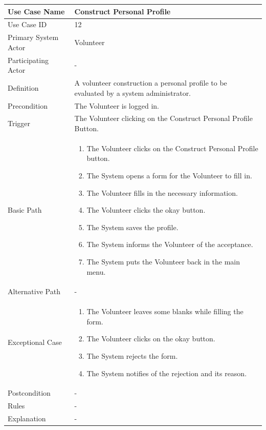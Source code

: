 \documentclass[a4paper,12pt]{report}
\begin{document}
		\begin{tabular}{|m{4cm}|m{11.5cm}|}
			\hline
				Use Case Name & Construct Personal Profile\\
			\hline
				Use Case ID & 12\\
			\hline
				Primary System Actor & Volunteer\\
			\hline
				Participating Actor & -\\
			\hline
				Definition & A volunteer construction a personal profile to be evaluated by a system administrator.\\
			\hline
				Precondition & The Volunteer is logged in.\\
			\hline
				Trigger & The Volunteer clicking on the Construct Personal Profile Button.\\
			\hline
				Basic Path & \begin{enumerate}
					\item The Volunteer clicks on the Construct Personal Profile button.
					\item The System opens a form for the Volunteer to fill in.
					\item The Volunteer fills in the necessary information.
					\item The Volunteer clicks the okay button.
					\item The System saves the profile.
					\item The System informs the Volunteer of the acceptance.
					\item The System puts the Volunteer back in the main menu.
				\end{enumerate}		
				\\
			\hline
				Alternative Path & -\\
			\hline
				Exceptional Case & \begin{enumerate}
					\item The Volunteer leaves some blanks while filling the form.
					\item The Volunteer clicks on the okay button.
					\item The System rejects the form.
					\item The System notifies of the rejection and its reason.
				\end{enumerate}
				\\
			\hline
				Postcondition & -\\
			\hline
				Rules & -\\
			\hline
				Explanation & -\\
			\hline
		\end{tabular}
\end{document}
